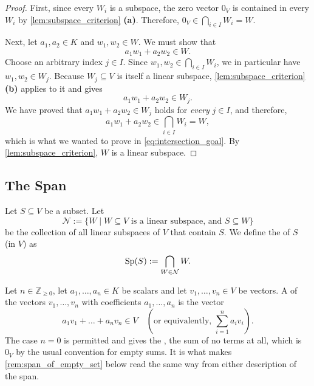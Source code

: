 \begin{proof}
First, since every $W_i$ is a subspace, the zero vector $0_V$ is contained in every $W_i$ by \cref{lem:subspace_criterion} \textbf{(a)}. Therefore, $0_V \in \bigcap_{i \in I} W_i = W$.

Next, let $a_1, a_2 \in K$ and $w_1, w_2 \in W$. We must show that
\begin{equation} \label{eq:intersection_goal}
a_1 w_1 + a_2 w_2 \in W.
\end{equation}
Choose an arbitrary index $j \in I$. Since $w_1, w_2 \in \bigcap_{i \in I} W_i$, we in particular have $w_1, w_2 \in W_j$. Because $W_j \subseteq V$ is itself a linear subspace, \cref{lem:subspace_criterion} \textbf{(b)} applies to it and gives
\[
a_1 w_1 + a_2 w_2 \in W_j.
\]
We have proved that $a_1 w_1 + a_2 w_2 \in W_j$ holds for \emph{every} $j \in I$, and therefore,
\[
a_1 w_1 + a_2 w_2 \in \bigcap_{i \in I} W_i = W,
\]
which is what we wanted to prove in \eqref{eq:intersection_goal}. By \cref{lem:subspace_criterion}, $W$ is a linear subspace.
\end{proof}

\subsection{The Span}

\begin{definition}[Span]
\label{def:span}
Let $S \subseteq V$ be a subset. Let
\[
\mathcal{N} := \{W \mid W \subseteq V \text{ is a linear subspace, and } S \subseteq W\}
\]
be the collection of all linear subspaces of $V$ that contain $S$. We define the  of $S$ (in $V$) as
\[
\operatorname{Sp}(S) := \bigcap_{W \in \mathcal{N}} W.
\]
\end{definition}

\begin{definition}
\label{def:linear_combination}
Let $n \in \mathbb{Z}_{\ge 0}$, let $a_1, \dots, a_n \in K$ be scalars and let $v_1, \dots, v_n \in V$ be vectors. A  of the vectors $v_1, \dots, v_n$ with coefficients $a_1, \dots, a_n$ is the vector
\[
a_1 v_1 + \dots + a_n v_n \in V \quad \left(\text{or equivalently, } \sum_{i=1}^n a_i v_i\right).
\]
The case $n = 0$ is permitted and gives the , the sum of no terms at all, which is $0_V$ by the usual convention for empty sums. It is what makes \cref{rem:span_of_empty_set} below read the same way from either description of the span.
\end{definition}

